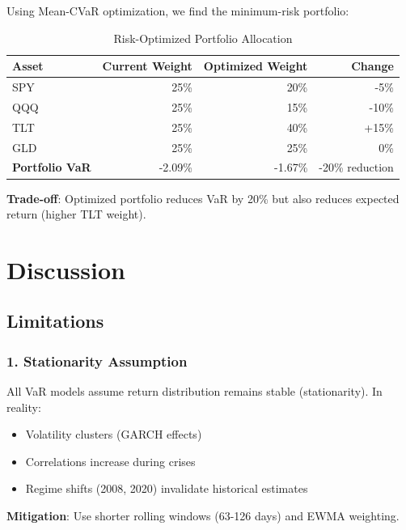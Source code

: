 \documentclass[12pt,a4paper]{article}
\begin{document}
Using Mean-CVaR optimization, we find the minimum-risk portfolio:

\begin{table}[H]
\centering
\begin{tabular}{@{}lrrr@{}}
\toprule
\textbf{Asset} & \textbf{Current Weight} & \textbf{Optimized Weight} & \textbf{Change} \\ \midrule
SPY & 25\% & 20\% & -5\% \\
QQQ & 25\% & 15\% & -10\% \\
TLT & 25\% & 40\% & +15\% \\
GLD & 25\% & 25\% & 0\% \\ \midrule
\textbf{Portfolio VaR} & -2.09\% & -1.67\% & -20\% reduction \\ \bottomrule
\end{tabular}
\caption{Risk-Optimized Portfolio Allocation}
\end{table}

\textbf{Trade-off}: Optimized portfolio reduces VaR by 20\% but also reduces expected return (higher TLT weight).

\newpage
\section{Discussion}

\subsection{Limitations}

\subsubsection{1. Stationarity Assumption}

All VaR models assume return distribution remains stable (stationarity). In reality:
\begin{itemize}
    \item Volatility clusters (GARCH effects)
    \item Correlations increase during crises
    \item Regime shifts (2008, 2020) invalidate historical estimates
\end{itemize}

\textbf{Mitigation}: Use shorter rolling windows (63-126 days) and EWMA weighting.
\end{document}
